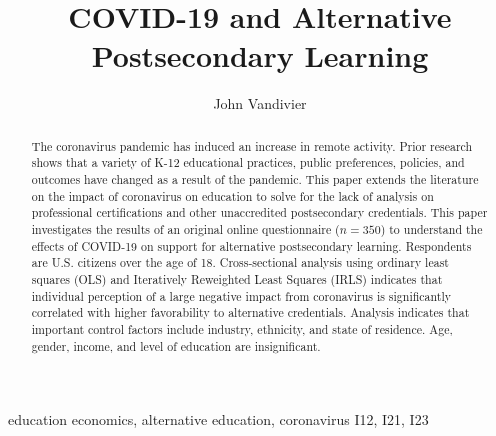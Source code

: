 \documentclass[review]{elsarticle}
\begin{document}
\begin{frontmatter}

    \title{
        COVID-19 and Alternative Postsecondary Learning
    }

    \author[mymainaddress]{John Vandivier}
    \address[mymainaddress]{4400 University Dr, Fairfax, VA 22030}

    \begin{abstract}
        The coronavirus pandemic has induced an increase in remote activity.
        Prior research shows that a variety of K-12 educational practices, public preferences, policies, and outcomes
        have changed as a result of the pandemic.
        This paper extends the literature on the impact of coronavirus on education
        to solve for the lack of analysis on professional certifications
        and other unaccredited postsecondary credentials.
        This paper investigates the results of an original online questionnaire ($n = 350$)
        to understand the effects of COVID-19
        on support for alternative postsecondary learning.
        Respondents are U.S. citizens over the age of 18.
        Cross-sectional analysis using ordinary least squares (OLS)
        and Iteratively Reweighted Least Squares (IRLS)
        indicates that individual perception of a large negative impact from coronavirus
        is significantly correlated with
        higher favorability to alternative credentials.
        Analysis indicates that important control factors include industry, ethnicity, and state of residence.
        Age, gender, income, and level of education are insignificant.
    \end{abstract}

    \begin{keyword}
        education economics, alternative education, coronavirus             %
        \MSC[2010] I12, I21, I23 %
    \end{keyword}

\end{frontmatter}
\end{document}
